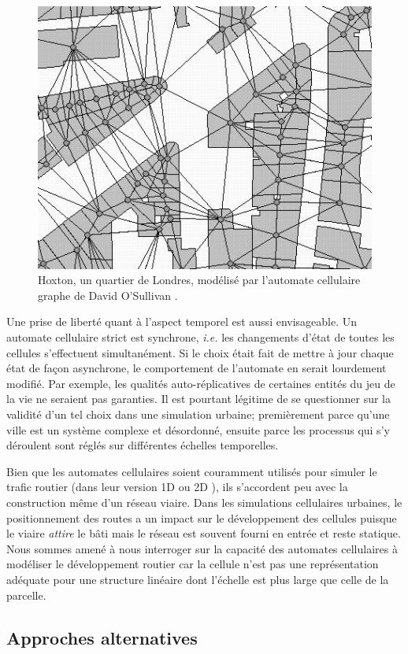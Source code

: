\documentclass[10pt]{article}
\begin{document}
\begin{figure}[H]
  \centering
  \includegraphics[width=.7\linewidth]{images/gca.png}
  \caption{Hoxton, un quartier de Londres, modélisé par l'automate
    cellulaire graphe de David O'Sullivan \cite{O'Sullivan2000}.}
  \label{fig:sullivan}
\end{figure}

Une prise de liberté quant à l'aspect temporel est aussi
envisageable. Un automate cellulaire strict est synchrone,
\textit{i.e.} les changements d'état de toutes les cellules
s'effectuent simultanément. Si le choix était fait de mettre à jour
chaque état de façon asynchrone, le comportement de l'automate en
serait lourdement modifié. Par exemple, les qualités auto-réplicatives
de certaines entités du jeu de la vie ne seraient pas garanties. Il
est pourtant légitime de se questionner sur la validité d'un tel choix
dans une simulation urbaine; premièrement parce qu'une ville est un
système complexe et désordonné, ensuite parce les processus qui s'y
déroulent sont réglés sur différentes échelles temporelles.

Bien que les automates cellulaires soient couramment utilisés pour
simuler le trafic routier (dans leur version 1D ou 2D
\cite{Queloz1996}), ils s'accordent peu avec la construction même d'un
réseau viaire. Dans les simulations cellulaires urbaines, le
positionnement des routes a un impact sur le développement des
cellules puisque le viaire \textit{attire} le bâti mais le réseau est
souvent fourni en entrée et reste statique. Nous sommes amené à nous
interroger sur la capacité des automates cellulaires à modéliser le
développement routier car la cellule n'est pas une représentation
adéquate pour une structure linéaire dont l'échelle est plus large que
celle de la parcelle.

\subsection{Approches alternatives}
\end{document}
